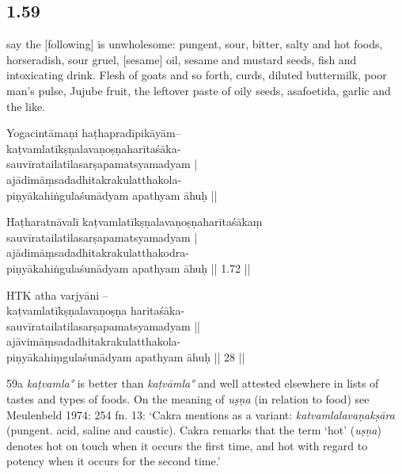\begin{ekdosis}
\begin{philcomm}[hp01_058]
\end{philcomm}

\subsection*{1.59}
\begin{translation}[hp01_059]
[Adepts] say the [following] is unwholesome: pungent, sour, bitter, salty and hot foods, horseradish, sour gruel, [sesame] oil, sesame and mustard seeds, fish and intoxicating drink. Flesh of goats and so forth, curds, diluted buttermilk, poor man's pulse, Jujube fruit, the leftover paste of oily seeds, asafoetida, garlic and the like.
\end{translation}

\begin{sources}[hp01_059]
\end{sources}

\begin{testimonia}[hp01_059]
Yogacintāmaṇi
\startverse
haṭhapradīpikāyām--\\
kaṭvamlatīkṣṇalavaṇoṣṇaharītaśāka-\\
sauvīratailatilasarṣapamatsyamadyam |\\
ajādimāṃsadadhitakrakulatthakola-\\
piṇyākahiṅgulaśunādyam apathyam āhuḥ ||
\endverse

Haṭharatnāvalī
\startverse
kaṭvamlatīkṣṇalavaṇoṣṇaharītaśākaṃ \\
sauvīratailatilasarṣapamatsyamadyam |\\
ajādimāṃsadadhitakrakulatthakodra-\\
piṇyākahiṅgulaśunādyam apathyam āhuḥ || 1.72 ||
\endverse

HTK
\startverse
atha varjyāni –\\
kaṭvamlatīkṣṇalavaṇoṣṇa haritaśāka-\\
sauvīratailatilasarṣapamatsyamadyam ||\\
ajāvimāṃsadadhitakrakulatthakola-\\
piṇyākahiṃgulaśunādyam apathyam āhuḥ || 28 ||
\endverse
\end{testimonia}

\begin{philcomm}[hp01_059]
59a \emph{kaṭvamla°} is better than \emph{kaṭvāmla°} and well attested elsewhere in lists of tastes and types of foods.
On the meaning of \emph{uṣṇa} (in relation to food) see Meulenbeld 1974: 254 fn. 13: ‘Cakra mentions as a variant: \emph{katvamlalavaṇakṣāra} (pungent. acid, saline and caustic). Cakra remarks that the term `hot' (\emph{uṣṇa}) denotes hot on touch when it occurs the first time, and hot with regard to potency when it occurs for the second time.’


\end{philcomm}
\end{ekdosis}
